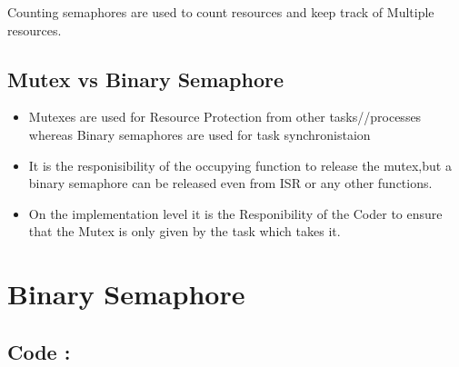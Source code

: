\documentclass[11pt,a4paper]{book}
\begin{document}
	Counting semaphores are used to count resources and keep track of Multiple resources.
	\\
	 
	\subsection{Mutex vs Binary Semaphore}
	\begin{itemize}
		\item Mutexes are used for Resource Protection from other tasks//processes whereas Binary semaphores are used for task synchronistaion
		\\
		\item It is the responisibility of the occupying function to release the mutex,but a binary semaphore can be released even from ISR or any other functions.
		\\
		\item On the implementation level it is the Responibility of the Coder to ensure that the Mutex is only given by the task which takes it.
		
	\end{itemize}
		
	
	
	
	\newpage	
	\section{Binary Semaphore}
	
\subsection{Code : }
		
	\newpage
\end{document}
